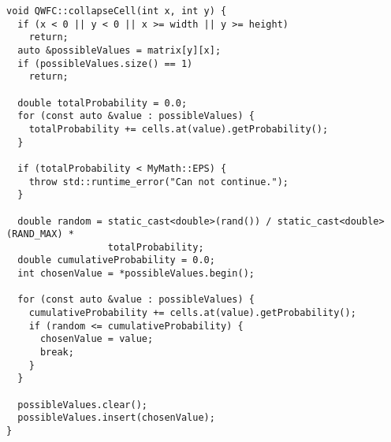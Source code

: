 \begin{lstlisting}[caption={Метод фиксирования состояния ячейки класса QWFC}, label={lst:qwfcoll}]
void QWFC::collapseCell(int x, int y) {
  if (x < 0 || y < 0 || x >= width || y >= height)
    return;
  auto &possibleValues = matrix[y][x];
  if (possibleValues.size() == 1)
    return;

  double totalProbability = 0.0;
  for (const auto &value : possibleValues) {
    totalProbability += cells.at(value).getProbability();
  }

  if (totalProbability < MyMath::EPS) {
    throw std::runtime_error("Can not continue.");
  }

  double random = static_cast<double>(rand()) / static_cast<double>(RAND_MAX) *
                  totalProbability;
  double cumulativeProbability = 0.0;
  int chosenValue = *possibleValues.begin();

  for (const auto &value : possibleValues) {
    cumulativeProbability += cells.at(value).getProbability();
    if (random <= cumulativeProbability) {
      chosenValue = value;
      break;
    }
  }

  possibleValues.clear();
  possibleValues.insert(chosenValue);
}
\end{lstlisting}


\renewcommand\thechapter{B}

